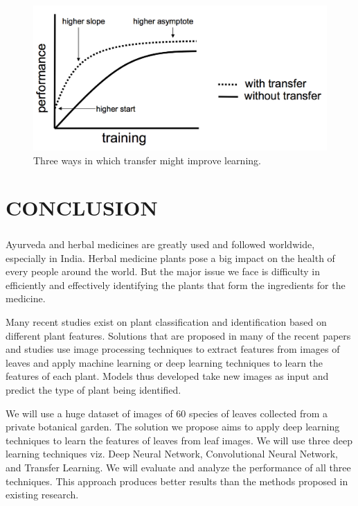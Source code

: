 \begin{figure}[h]
	\label{ss}
	\centering
	\includegraphics[width= 16 cm]{transfer.png}
	\caption{Three ways in which transfer might improve learning.}
\end{figure}


\chapter{CONCLUSION}
\paragraph{}
Ayurveda and herbal medicines are greatly used and followed worldwide, especially in India. Herbal medicine plants pose a big impact on the health of every people around the world. But the major issue we face is difficulty in efficiently and effectively identifying the plants that form the ingredients for the medicine.

Many recent studies exist on plant classification and identification based on different plant features. Solutions that are proposed in many of the recent papers and studies use image processing techniques to extract features from images of leaves and apply machine learning or deep learning techniques to learn the features of each plant. Models thus developed take new images as input and predict the type of plant being identified.

We will use a huge dataset of images of 60 species of leaves collected from a private botanical garden. The solution we propose aims to apply deep learning techniques to learn the features of leaves from leaf images. We will use three deep learning techniques viz. Deep Neural Network, Convolutional Neural Network, and Transfer Learning. We will evaluate and analyze the performance of all three techniques. This approach produces better results than the methods proposed in existing research.
 
